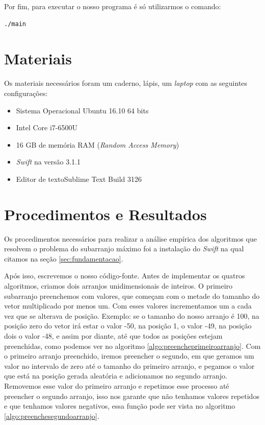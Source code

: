 \documentclass[
	12pt,				%
	oneside,   	        %
	a4paper,			%
	english,			%
	french,				%
	spanish,			%
	brazil,				%
	]{pacotes/abntex2}
\begin{document}
Por fim, para executar o nosso programa é só utilizarmos o comando:

\begin{lstlisting}[language=bash]
    ./main
\end{lstlisting}

\section{Materiais}
\label{sec:materiais}
Os materiais necessários foram um caderno, lápis, um \textit{laptop} com as seguintes configurações:
\begin{itemize}
    \item Sistema Operacional Ubuntu 16.10 64 bits    
    \item Intel Core i7-6500U
    \item 16 GB de memória RAM (\textit{Random Access Memory})
    \item \textit{Swift} na versão 3.1.1 
    \item Editor de textoSublime Text Build 3126
\end{itemize}

\section{Procedimentos e Resultados}
\label{sec:procedimentos}
Os procedimentos necessários para realizar a análise empírica dos algoritmos que resolvem o problema do subarranjo máximo foi a instalação do \textit{Swift} na qual citamos na seção \ref{sec:fundamentacao}. 

Após isso, escrevemos o nosso código-fonte. Antes de implementar os quatros algoritmos, criamos dois arranjos unidimensionais de inteiros. O primeiro subarranjo preenchemos com valores, que começam com o metade do tamanho do vetor multiplicado por menos um. Com esses valores incrementamos um a cada vez que se alterava de posição. Exemplo: se o tamanho do nosso arranjo é 100, na posição zero do vetor irá estar o valor -50, na posição 1, o valor -49, na posição dois o valor -48, e assim por diante, até que todos as posições estejam preenchidas, como podemos ver no algoritmo \ref{algo:preencheprimeiroarranjo}. Com o primeiro arranjo preenchido, iremos preencher o segundo, em que geramos um valor no intervalo de zero até o tamanho do primeiro arranjo, e pegamos o valor que está na posição gerada aleatória e adicionamos no segundo arranjo. Removemos esse valor do primeiro arranjo e repetimos esse processo até preencher o segundo arranjo, isso nos garante que não tenhamos valores repetidos e que tenhamos valores negativos, essa função pode ser vista no algoritmo  \ref{algo:preenchesegundoarranjo}.
\end{document}
